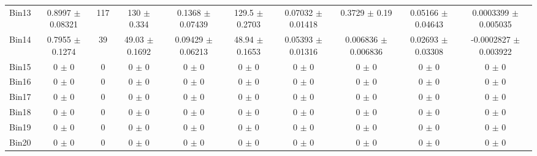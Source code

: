 \begin{tabular}{@{\extracolsep{4pt}}lccccccccc@{}}
     Bin13 & 0.8997 $\pm$ 0.08321 & 117 & 130 $\pm$ 0.334 & 0.1368 $\pm$ 0.07439 & 129.5 $\pm$ 0.2703 & 0.07032 $\pm$ 0.01418 & 0.3729 $\pm$ 0.19 & 0.05166 $\pm$ 0.04643 & 0.0003399 $\pm$ 0.005035 \\ 
     Bin14 & 0.7955 $\pm$ 0.1274 & 39 & 49.03 $\pm$ 0.1692 & 0.09429 $\pm$ 0.06213 & 48.94 $\pm$ 0.1653 & 0.05393 $\pm$ 0.01316 & 0.006836 $\pm$ 0.006836 & 0.02693 $\pm$ 0.03308 & -0.0002827 $\pm$ 0.003922 \\ 
     Bin15 & 0 $\pm$ 0 & 0 & 0 $\pm$ 0 & 0 $\pm$ 0 & 0 $\pm$ 0 & 0 $\pm$ 0 & 0 $\pm$ 0 & 0 $\pm$ 0 & 0 $\pm$ 0 \\ 
     Bin16 & 0 $\pm$ 0 & 0 & 0 $\pm$ 0 & 0 $\pm$ 0 & 0 $\pm$ 0 & 0 $\pm$ 0 & 0 $\pm$ 0 & 0 $\pm$ 0 & 0 $\pm$ 0 \\ 
     Bin17 & 0 $\pm$ 0 & 0 & 0 $\pm$ 0 & 0 $\pm$ 0 & 0 $\pm$ 0 & 0 $\pm$ 0 & 0 $\pm$ 0 & 0 $\pm$ 0 & 0 $\pm$ 0 \\ 
     Bin18 & 0 $\pm$ 0 & 0 & 0 $\pm$ 0 & 0 $\pm$ 0 & 0 $\pm$ 0 & 0 $\pm$ 0 & 0 $\pm$ 0 & 0 $\pm$ 0 & 0 $\pm$ 0 \\ 
     Bin19 & 0 $\pm$ 0 & 0 & 0 $\pm$ 0 & 0 $\pm$ 0 & 0 $\pm$ 0 & 0 $\pm$ 0 & 0 $\pm$ 0 & 0 $\pm$ 0 & 0 $\pm$ 0 \\ 
     Bin20 & 0 $\pm$ 0 & 0 & 0 $\pm$ 0 & 0 $\pm$ 0 & 0 $\pm$ 0 & 0 $\pm$ 0 & 0 $\pm$ 0 & 0 $\pm$ 0 & 0 $\pm$ 0 \\ 
\hline\hline
  \end{tabular}
